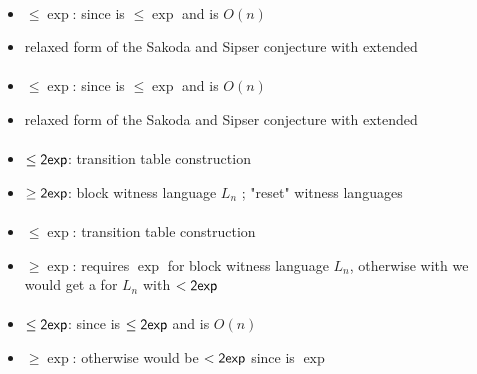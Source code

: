 \paragraph{\ONFA{}\tto\ODLA}
\begin{itemize}
	\item $\le\exp$: since \hyperref[cost:1NFAto1DFA]{\ONFA{}\tto\ODFA} is $\le\exp$ and \ODFA\tto\ODLA is $O(n)$
	\item relaxed form of the Sakoda and Sipser conjecture with extended \TDFA
\end{itemize}
\paragraph{\TNFA{}\tto\ODLA}
\begin{itemize}
	\item $\le\exp$: since \hyperref[cost:2NFAto1DFA]{\TNFA{}\tto\ODFA} is $\le\exp$ and \ODFA\tto\ODLA is $O(n)$
	\item relaxed form of the Sakoda and Sipser conjecture with extended \TDFA
\end{itemize}
\paragraph{\OLA{}\tto\ODFA}\label{cost:1LAto1DFA}
\begin{itemize}
	\item $\le\mathsf{2exp}$: transition table construction \cite{PigPis14}
	\item $\ge\mathsf{2exp}$: block witness language $L_n$ \cite{PigPis14}; "reset" witness languages \cite{PigPri+22}
\end{itemize}
\paragraph{\OLA{}\tto\ONFA}\label{cost:1LAto1NFA}
\begin{itemize}
	\item $\le\exp$: transition table construction \cite{PigPis14}
	\item $\ge\exp$: \ONFA requires $\exp$ for block witness language $L_n$, otherwise with \hyperref[cost:1NFAto1DFA]{\ONFA{}\tto\ODFA} we would get a \ODFA for $L_n$ with $<\mathsf{2exp}$ \cite{PigPis14}
\end{itemize}
\paragraph{\OLA{}\tto\TDFA}
\begin{itemize}
	\item $\le\mathsf{2exp}$: since \hyperref[cost:1LAto1DFA]{\OLA{}\tto\ODFA} is $\le\mathsf{2exp}$ and \ODFA\tto\TDFA is $O(n)$
	\item $\ge\exp$: otherwise \hyperref[cost:1LAto1DFA]{\OLA{}\tto\ODFA} would be $<\mathsf{2exp}$ since \hyperref[cost:2DFAto1DFA]{\TDFA{}\tto\ODFA} is $\exp$
\end{itemize}
